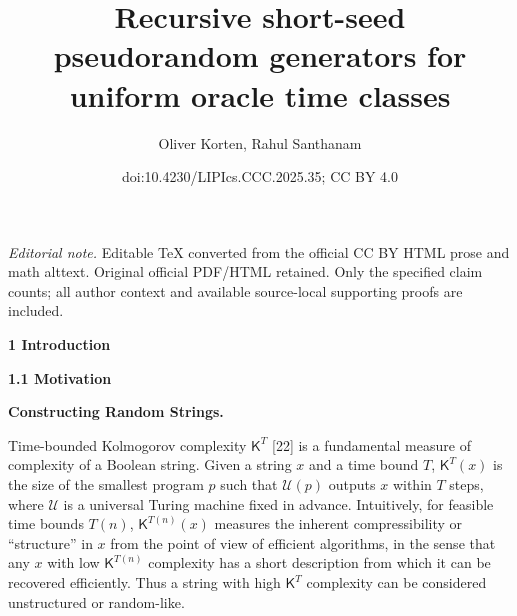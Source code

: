 \documentclass[10pt,a4paper]{article}
\title{Recursive short-seed pseudorandom generators for uniform oracle time classes}
\author{Oliver Korten, Rahul Santhanam}
\date{doi:10.4230/LIPIcs.CCC.2025.35; CC BY 4.0}
\begin{document}
\maketitle
\noindent\textit{Editorial note.} Editable TeX converted from the official CC BY HTML prose and math alttext. Original official PDF/HTML retained. Only the specified claim counts; all author context and available source-local supporting proofs are included.\par\medskip


\par\medskip\noindent\textbf{
1 Introduction}\par




\par\medskip\noindent\textbf{
1.1 Motivation}\par




\par\medskip\noindent\textbf{Constructing Random Strings.}\par




Time-bounded Kolmogorov complexity ${\mathsf{K}}^{T}$ [22] is a fundamental measure of complexity of a Boolean string. Given a string $x$ and a time bound $T$, ${\mathsf{K}}^{T}(x)$ is the size of the smallest program $p$ such that $\mathcal{U}(p)$ outputs $x$ within $T$ steps, where $\mathcal{U}$ is a universal Turing machine fixed in advance. Intuitively, for feasible time bounds $T(n)$, ${\mathsf{K}}^{T(n)}(x)$ measures the inherent compressibility or “structure” in $x$ from the point of view of efficient algorithms, in the sense that any $x$ with low ${\mathsf{K}}^{T(n)}$ complexity has a short description from which it can be recovered efficiently. Thus a string with high ${\mathsf{K}}^{T}$ complexity can be considered unstructured or random-like.\par
\end{document}
